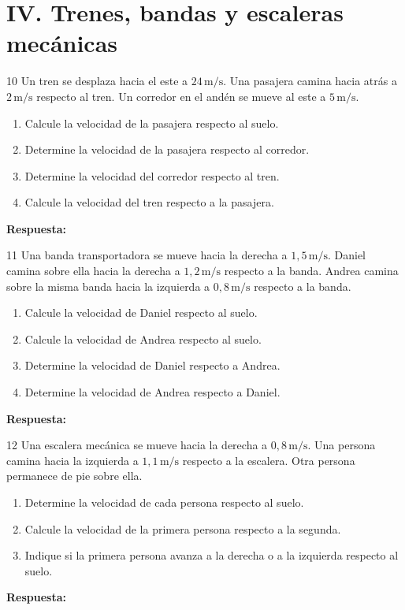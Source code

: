 \documentclass[11pt,letterpaper]{article}
\newcommand{\espacio}[1]{\par\vspace{#1}\par}
\newcommand{\renglon}{\par\textcolor{morado}{\bfseries Respuesta:}\ \dotfill\par}
\begin{document}
\section*{IV. Trenes, bandas y escaleras mecánicas}
\begin{problema}{10}
Un tren se desplaza hacia el este a $24\,\mathrm{m/s}$. Una pasajera camina hacia atrás a $2\,\mathrm{m/s}$ respecto al tren. Un corredor en el andén se mueve al este a $5\,\mathrm{m/s}$.
\begin{enumerate}[label=\alph*)]
\item Calcule la velocidad de la pasajera respecto al suelo.
\item Determine la velocidad de la pasajera respecto al corredor.
\item Determine la velocidad del corredor respecto al tren.
\item Calcule la velocidad del tren respecto a la pasajera.
\end{enumerate}
\espacio{4.5cm}\renglon
\end{problema}
\begin{problema}{11}
Una banda transportadora se mueve hacia la derecha a $1,5\,\mathrm{m/s}$. Daniel camina sobre ella hacia la derecha a $1,2\,\mathrm{m/s}$ respecto a la banda. Andrea camina sobre la misma banda hacia la izquierda a $0,8\,\mathrm{m/s}$ respecto a la banda.
\begin{enumerate}[label=\alph*)]
\item Calcule la velocidad de Daniel respecto al suelo.
\item Calcule la velocidad de Andrea respecto al suelo.
\item Determine la velocidad de Daniel respecto a Andrea.
\item Determine la velocidad de Andrea respecto a Daniel.
\end{enumerate}
\espacio{4.5cm}\renglon
\end{problema}
\clearpage
\begin{problema}{12}
Una escalera mecánica se mueve hacia la derecha a $0,8\,\mathrm{m/s}$. Una persona camina hacia la izquierda a $1,1\,\mathrm{m/s}$ respecto a la escalera. Otra persona permanece de pie sobre ella.
\begin{enumerate}[label=\alph*)]
\item Determine la velocidad de cada persona respecto al suelo.
\item Calcule la velocidad de la primera persona respecto a la segunda.
\item Indique si la primera persona avanza a la derecha o a la izquierda respecto al suelo.
\end{enumerate}
\espacio{5cm}\renglon
\end{problema}
\end{document}
